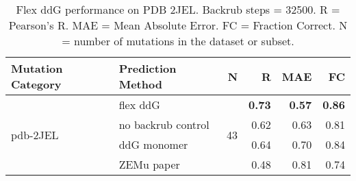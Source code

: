 \begin{table}
  \begin{tabular}{llrrrr}
\toprule
Mutation Category &   Prediction Method &   N &    R &  MAE &   FC \\
\midrule
 \multirow{ 4}{*}{pdb-2JEL} & flex ddG & \multirow{ 4}{*}{43} & \textbf{0.73} & \textbf{0.57} & \textbf{0.86}  \\
 & no backrub control & & 0.62 & 0.63 & 0.81  \\
 & ddG monomer & & 0.64 & 0.70 & 0.84  \\
 & ZEMu paper & & 0.48 & 0.81 & 0.74  \\
\bottomrule
\end{tabular}
  \caption[Flex ddG performance on PDB 2JEL]{
    Flex ddG performance on PDB 2JEL. Backrub steps = 32500. R = Pearson's R. MAE = Mean Absolute Error. FC = Fraction Correct. N = number of mutations in the dataset or subset.
  } \label{tab:table-pdb-2JEL}
\end{table}
